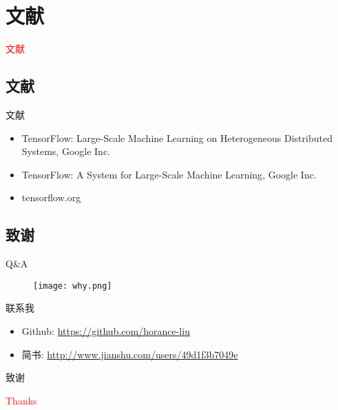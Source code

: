 \section{文献}
\label{sec:reference}

\begin{frame}
  \begin{center}
    \Huge{\textcolor{red}{文献}}
  \end{center}
\end{frame}

\subsection{文献}

\begin{frame}{文献}
    \begin{itemize}
    \item \alert{TensorFlow: Large-Scale Machine Learning on Heterogeneous Distributed Systems}, Google Inc.
    \item \alert{TensorFlow: A System for Large-Scale Machine Learning}, Google Inc.
    \item \alert{tensorflow.org}
    \end{itemize}
\end{frame}

\subsection{致谢}

\begin{frame}{Q\&A}
  \begin{figure}
    \centering
    \texttt{[image: why.png]}
  \end{figure}
\end{frame}

\begin{frame}{联系我}
    \begin{itemize}
    \item \alert{Github}: \href{https://github.com/horance-liu}{https://github.com/horance-liu}    
    \item \alert{简书}: \href{http://www.jianshu.com/users/49d1f3b7049e}{http://www.jianshu.com/users/49d1f3b7049e}
    \end{itemize}
\end{frame}

\begin{frame}{致谢}  
  \begin{center}
    \Huge{\textcolor{red}{Thanks}}
  \end{center}
\end{frame}
